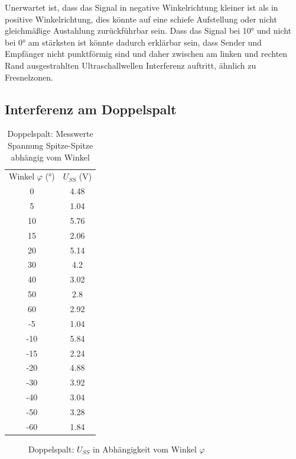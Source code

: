 \documentclass[
  headings=optiontotocandhead,
  twoside,
  openright,
  numbers=noenddot,
  toc=flat,
  11pt,
  parskip=full,
  listof=flat,
  bibliography=totoc,
  a4paper,
  DIV=14,
  BCOR=22mm,
  headheight=5mm,
  headinclude=true,
]{scrartcl}
\begin{document}
Unerwartet ist, dass das Signal in negative Winkelrichtung kleiner ist als in positive Winkelrichtung, dies könnte auf eine schiefe Aufstellung oder nicht gleichmäßige Austahlung zurückführbar sein. Dass das Signal bei 10° und nicht bei 0° am stärksten ist könnte dadurch erklärbar sein, dass Sender und Empfänger nicht punktförmig sind und daher zwischen am linken und rechten Rand ausgestrahlten Ultraschallwellen Interferenz auftritt, ähnlich zu Fresnelzonen. 


\subsection{Interferenz am Doppelspalt}

\begin{table}[H]
  \centering
  \setlength{\tabcolsep}{10pt}
  \begin{tabular}{ |c|c| }
    \multicolumn{1}{c}{Winkel $\varphi$ (°)} & \multicolumn{1}{c}{$U_{SS}$ (V)} \\
    0  & 4.48 \\
    5  & 1.04 \\
    10 & 5.76 \\
    15 & 2.06 \\
    20 & 5.14 \\
    30 & 4.2 \\
    40 & 3.02 \\
    50 & 2.8 \\
    60 & 2.92 \\
    -5 & 1.04\\
   -10 & 5.84 \\
   -15 & 2.24 \\
   -20 & 4.88 \\
   -30 & 3.92\\
   -40 & 3.04\\
   -50 & 3.28\\
   -60 & 1.84\\
  \end{tabular}
  \caption{Doppelspalt: Messwerte Spannung Spitze-Spitze abhängig vom Winkel}
  \label{tab:doppelspalt1}
\end{table}

\begin{figure}[H]
  \centering
  \caption{Doppelspalt: $U_{SS}$ in Abhängigkeit vom Winkel $\varphi$}
  \label{fig:doppelspalt_kart}
\end{figure}
\end{document}
